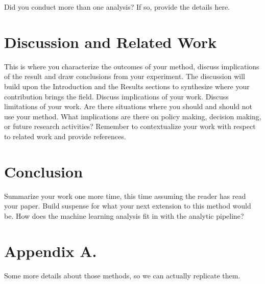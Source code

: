 \documentclass[twoside,11pt]{article}
\begin{document}
Did you conduct more than one analysis? If so, provide the details here.

\section{Discussion and Related Work} 

This is where you characterize the outcomes of your method, discuss implications of the result and draw conclusions from your experiment.
The discussion will build upon the Introduction and the Results sections to synthesize where your contribution brings the field. Discuss implications of your work. 
Discuss limitations of your work.
Are there situations where you should and should not use your method.
What implications are there on policy making, decision making, or future research activities?
Remember to contextualize your work with respect to related work and provide references.

\section{Conclusion} 
Summarize your work one more time, this time assuming the reader has read your paper.
Build suspense for what your next extension to this method would be.  How does the machine learning analysis fit in with the analytic pipeline?



\appendix
\section*{Appendix A.}
Some more details about those methods, so we can actually replicate them.
\end{document}
